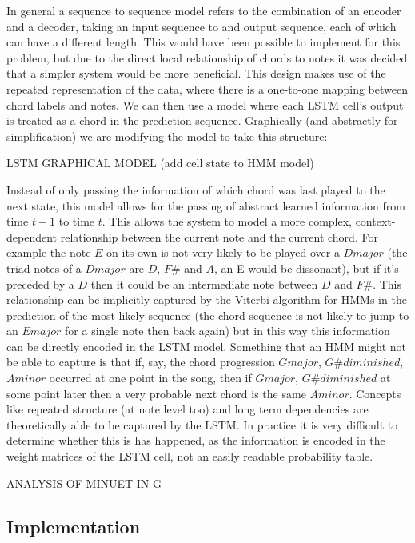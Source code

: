 \documentclass[bsc,singlespacing,logo, parskip, deptreport]{infthesis}
\begin{document}
In general a sequence to sequence model refers to the combination of an encoder and a decoder, taking an input sequence to and output sequence, each of which can have a different length. This would have been possible to implement for this problem, but due to the direct local relationship of chords to notes it was decided that a simpler system would be more beneficial. This design makes use of the repeated representation of the data, where there is a one-to-one mapping between chord labels and notes. We can then use a model where each LSTM cell's output is treated as a chord in the prediction sequence. Graphically (and abstractly for simplification) we are modifying the model to take this structure:

LSTM GRAPHICAL MODEL (add cell state to HMM model)

Instead of only passing the information of which chord was last played to the next state, this model allows for the passing of abstract learned information from time $t-1$ to time $t$. This allows the system to model a more complex, context-dependent relationship between the current note and the current chord. For example the note $E$ on its own is not very likely to be played over a $D major$ (the triad notes of a $D major$ are $D$, $F\#$ and $A$, an E would be dissonant), but if it's preceded by a $D$ then it could be an intermediate note between $D$ and $F\#$. This relationship can be implicitly captured by the Viterbi algorithm for HMMs in the prediction of the most likely sequence (the chord sequence is not likely to jump to an $E major$ for a single note then back again) but in this way this information can be directly encoded in the LSTM model. Something that an HMM might not be able to capture is that if, say, the chord progression $G major$, $G\# diminished$, $A minor$ occurred at one point in the song, then if $G major$, $G\# diminished$ at some point later then a very probable next chord is the same $A minor$. Concepts like repeated structure (at note level too) and long term dependencies are theoretically able to be captured by the LSTM. In practice it is very difficult to determine whether this is has happened, as the information is encoded in the weight matrices of the LSTM cell, not an easily readable probability table.

ANALYSIS OF MINUET IN G

\subsection{Implementation} \label{LSTM IMP}
\end{document}
